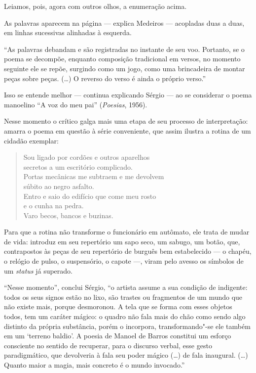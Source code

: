 Leiamos, pois, agora com outros olhos, a enumeração acima.

As palavras aparecem na página --- explica Medeiros --- acopladas duas a duas, em linhas sucessivas alinhadas à
esquerda.

``As palavras debandam e são registradas no instante de seu voo.
Portanto, se o poema se decompõe, enquanto composição tradicional em
versos, no momento seguinte ele se repõe, surgindo como um jogo, como
uma brincadeira de montar peças sobre peças. (\ldots{}) O reverso do verso é
ainda o próprio verso.''

Isso se entende melhor --- continua explicando Sérgio --- ao se considerar
o poema manoelino ``A voz do meu pai'' (\emph{Poesias}, 1956).

Nesse momento o crítico galga mais uma etapa de seu processo de
interpretação: amarra o poema em questão à série conveniente, que assim
ilustra a rotina de um cidadão exemplar:

\begin{verse}
Sou ligado por cordões e outros aparelhos\\
secretos a um escritório complicado. \\
Portas mecânicas me subtraem e me devolvem\\
súbito ao negro asfalto. \\
Entro e saio do edifício que come meu rosto\\
e o cunha na pedra. \\
Varo becos, bancos e buzinas.
\end{verse}

Para que a rotina não transforme o funcionário em autômato, ele trata de
mudar de vida: introduz em seu repertório um sapo seco, um sabugo, um
botão, que, contrapostos às peças de seu repertório de burguês bem
estabelecido --- o chapéu, o relógio de pulso, o suspensório, o capote
---, viram pelo avesso os símbolos de um \emph{status} já superado.

``Nesse momento'', conclui Sérgio, ``o artista assume a sua condição
de indigente: todos os seus signos estão no lixo, são trastes ou
fragmentos de um mundo que não existe mais, porque desmoronou. A tela
que se forma com esses objetos todos, tem um caráter mágico: o quadro
não fala mais do chão como sendo algo distinto da própria substância,
porém o incorpora, transformando"-se ele também em um `terreno baldio'.
A poesia de Manoel de Barros constitui um esforço consciente no sentido
de recuperar, para o discurso verbal, esse gesto paradigmático, que
devolveria à fala seu poder mágico (\ldots{}) de fala inaugural. (\ldots{}) Quanto
maior a magia, mais concreto é o mundo invocado.''

